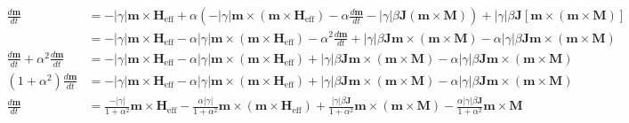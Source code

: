 \documentclass[reprint,amsmath,amssymb,aps, floatfix]{revtex4-2}
\begin{document}
\begin{widetext}
\begin{equation}
    \begin{aligned}
        \frac{d \mathbf{m}}{d t} & = -\left|\gamma\right|\mathbf{m} \times \mathbf{H}_{\text{eff}} + \alpha\left(-\left|\gamma\right|\mathbf{m}\times\left(\mathbf{m} \times \mathbf{H}_{\text{eff}}\right) - \alpha \frac{d \mathbf{m}}{d t} - \left|\gamma\right|\beta \mathbf{J}\left(\mathbf{m}\times\mathbf{M}\right)\right) + \left|\gamma\right|\beta \mathbf{J} \left[ \mathbf{m} \times \left(\mathbf{m}\times\mathbf{M}\right) \right] \\[1ex]
        & = -\left|\gamma\right|\mathbf{m}\times\mathbf{H}_{\text{eff}} - \alpha\left|\gamma\right|\mathbf{m}\times\left(\mathbf{m}\times\mathbf{H}_{\text{eff}}\right) - \alpha^2\frac{d \mathbf{m}}{d t} + \left|\gamma\right|\beta\mathbf{J}\mathbf{m}\times\left(\mathbf{m}\times\mathbf{M}\right) - \alpha\left|\gamma\right|\beta\mathbf{J}\mathbf{m}\times\left(\mathbf{m}\times\mathbf{M}\right) \\[1ex]
        \frac{d \mathbf{m}}{d t}  + \alpha^2\frac{d \mathbf{m}}{d t} & = -\left|\gamma\right|\mathbf{m}\times\mathbf{H}_{\text{eff}} - \alpha\left|\gamma\right|\mathbf{m}\times\left(\mathbf{m}\times\mathbf{H}_{\text{eff}}\right) + \left|\gamma\right|\beta\mathbf{J}\mathbf{m}\times\left(\mathbf{m}\times\mathbf{M}\right) - \alpha\left|\gamma\right|\beta\mathbf{J}\mathbf{m}\times\left(\mathbf{m}\times\mathbf{M}\right) \\[1ex]
        (1 + \alpha^2)\frac{d \mathbf{m}}{d t} & = -\left|\gamma\right|\mathbf{m}\times\mathbf{H}_{\text{eff}} - \alpha\left|\gamma\right|\mathbf{m}\times\left(\mathbf{m}\times\mathbf{H}_{\text{eff}}\right) + \left|\gamma\right|\beta\mathbf{J}\mathbf{m}\times\left(\mathbf{m}\times\mathbf{M}\right) - \alpha\left|\gamma\right|\beta\mathbf{J}\mathbf{m}\times\left(\mathbf{m}\times\mathbf{M}\right) \\[1ex]
        \frac{d \mathbf{m}}{d t} & = \frac{-\left|\gamma\right|}{1+\alpha^2}\mathbf{m}\times\mathbf{H}_{\text{eff}} - \frac{\alpha\left|\gamma\right|}{1+\alpha^2}\mathbf{m}\times\left(\mathbf{m}\times\mathbf{H}_{\text{eff}}\right) + \frac{\left|\gamma\right|\beta\mathbf{J}}{1+\alpha^2}\mathbf{m}\times\left(\mathbf{m}\times\mathbf{M}\right) - \frac{\alpha\left|\gamma\right|\beta\mathbf{J}}{1+\alpha^2}\mathbf{m}\times\mathbf{M}
    \end{aligned}
    \label{equ:LLGS_explicit_derivation}
\end{equation}


\end{widetext}
\end{document}
